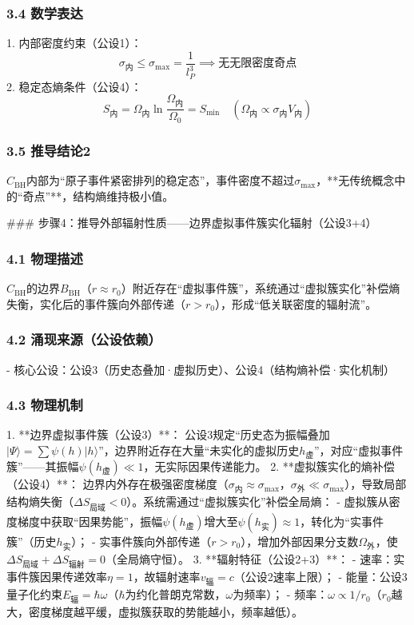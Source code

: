 \documentclass{article}
\begin{document}
\subsubsection{3.4 数学表达}
1. 内部密度约束（公设1）：  
   \[
   \sigma_{\text{内}} \leq \sigma_{\text{max}} = \frac{1}{l_P^3} \implies \text{无无限密度奇点}
   \]
2. 稳定态熵条件（公设4）：  
   \[
   S_{\text{内}} = \Omega_{\text{内}} \ln\frac{\Omega_{\text{内}}}{\Omega_0} = S_{\text{min}} \quad (\Omega_{\text{内}} \propto \sigma_{\text{内}} V_{\text{内}})
   \]

\subsubsection{3.5 推导结论2}
\(C_{\text{BH}}\)内部为“原子事件紧密排列的稳定态”，事件密度不超过\(\sigma_{\text{max}}\)，**无传统概念中的“奇点”**，结构熵维持极小值。


### 步骤4：推导外部辐射性质——边界虚拟事件簇实化辐射（公设3+4）
\subsubsection{4.1 物理描述}
\(C_{\text{BH}}\)的边界\(B_{\text{BH}}\)（\(r \approx r_0\)）附近存在“虚拟事件簇”，系统通过“虚拟簇实化”补偿熵失衡，实化后的事件簇向外部传递（\(r > r_0\)），形成“低关联密度的辐射流”。

\subsubsection{4.2 涌现来源（公设依赖）}
- 核心公设：公设3（历史态叠加·虚拟历史）、公设4（结构熵补偿·实化机制）

\subsubsection{4.3 物理机制}
1. **边界虚拟事件簇（公设3）**：  
   公设3规定“历史态为振幅叠加\(|\Psi\rangle = \sum \psi(h) |h\rangle\)”，边界附近存在大量“未实化的虚拟历史\(h_{\text{虚}}\)”，对应“虚拟事件簇”——其振幅\(\psi(h_{\text{虚}}) \ll 1\)，无实际因果传递能力。
2. **虚拟簇实化的熵补偿（公设4）**：  
   边界内外存在极强密度梯度（\(\sigma_{\text{内}} \approx \sigma_{\text{max}}\)，\(\sigma_{\text{外}} \ll \sigma_{\text{max}}\)），导致局部结构熵失衡（\(\Delta S_{\text{局域}} < 0\)）。系统需通过“虚拟簇实化”补偿全局熵：  
   - 虚拟簇从密度梯度中获取“因果势能”，振幅\(\psi(h_{\text{虚}})\)增大至\(\psi(h_{\text{实}}) \approx 1\)，转化为“实事件簇”（历史\(h_{\text{实}}\)）；  
   - 实事件簇向外部传递（\(r > r_0\)），增加外部因果分支数\(\Omega_{\text{外}}\)，使\(\Delta S_{\text{局域}} + \Delta S_{\text{辐射}} = 0\)（全局熵守恒）。
3. **辐射特征（公设2+3）**：  
   - 速率：实事件簇因果传递效率\(\eta = 1\)，故辐射速率\(v_{\text{辐}} = c\)（公设2速率上限）；  
   - 能量：公设3量子化约束\(E_{\text{辐}} = \hbar \omega\)（\(\hbar\)为约化普朗克常数，\(\omega\)为频率）；  
   - 频率：\(\omega \propto 1/r_0\)（\(r_0\)越大，密度梯度越平缓，虚拟簇获取的势能越小，频率越低）。
\end{document}
